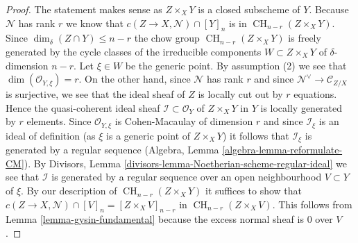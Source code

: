 \documentclass[10pt,a4paper]{amsart}
\theoremstyle{plain}
\theoremstyle{definition}
\theoremstyle{remark}
\numberwithin{equation}{subsection}
\def\CH{\mathop{\mathrm{CH}}\nolimits}
\begin{document}
\begin{proof}
The statement makes sense as $Z \times_X Y$ is a closed subscheme of $Y$.
Because $\mathcal{N}$ has rank $r$ we know that
$c(Z \to X, \mathcal{N}) \cap [Y]_n$ is in $\CH_{n - r}(Z \times_X Y)$.
Since $\dim_\delta(Z \cap Y) \leq n - r$ the chow group
$\CH_{n - r}(Z \times_X Y)$ is freely generated by the
cycle classes of the irreducible components $W \subset Z \times_X Y$
of $\delta$-dimension $n - r$. Let $\xi \in W$ be the generic point.
By assumption (2) we see that $\dim(\mathcal{O}_{Y, \xi}) = r$.
On the other hand, since $\mathcal{N}$ has rank $r$ and since
$\mathcal{N}^\vee \to \mathcal{C}_{Z/X}$ is surjective, we see that
the ideal sheaf of $Z$ is locally cut out by $r$ equations.
Hence the quasi-coherent ideal sheaf $\mathcal{I} \subset \mathcal{O}_Y$
of $Z \times_X Y$ in $Y$ is locally generated by $r$ elements.
Since $\mathcal{O}_{Y, \xi}$ is Cohen-Macaulay of dimension $r$
and since $\mathcal{I}_\xi$ is an ideal of definition (as $\xi$ is
a generic point of $Z \times_X Y$) it follows that $\mathcal{I}_\xi$
is generated by a regular sequence
(Algebra, Lemma \ref{algebra-lemma-reformulate-CM}).
By Divisors, Lemma \ref{divisors-lemma-Noetherian-scheme-regular-ideal}
we see that $\mathcal{I}$ is generated by a regular sequence over
an open neighbourhood $V \subset Y$ of $\xi$. By our description of
$\CH_{n - r}(Z \times_X Y)$ it suffices to show that
$c(Z \to X, \mathcal{N}) \cap [V]_n = [Z \times_X V]_{n - r}$
in $\CH_{n - r}(Z \times_X V)$. This follows from
Lemma \ref{lemma-gysin-fundamental}
because the excess normal sheaf is $0$ over $V$.
\end{proof}
\end{document}
